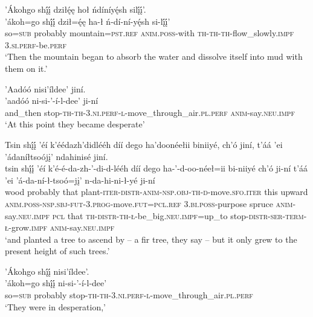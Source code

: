 \ea\label{ex:text4-2-17}
’Ákohgo shį́į́ dziłę́ę hoł ńdíníyę́sh silį́į́’.\\
\gll ’ákoh=go	shį́į́	dził=ę́ę	ha-ł	ń-dí-ní-yę́sh	si-lį́į́’\\
     so=\textsc{sub}	probably	mountain=\textsc{pst}.\textsc{ref}	\textsc{anim}.\textsc{poss}-with	\textsc{th}-\textsc{th}-\textsc{th}-flow\_slowly.\textsc{impf}	3.\textsc{si}.\textsc{perf}-be.\textsc{perf}\\
\glt `Then the mountain began to absorb the water and dissolve itself into mud with them on it.'
\z

\ea\label{ex:text4-2-18}
’Aadóó nisi’íldee’ jiní.\\
\gll ’aadóó	ni-si-’-í-l-dee’	ji-ní\\
     and\_then	stop-\textsc{th}-\textsc{th}-3.\textsc{ni}.\textsc{perf}-\textsc{l}-move\_through\_air.\textsc{pl}.\textsc{perf}	\textsc{anim}-say.\textsc{neu}.\textsc{impf}\\
\glt `At this point they became desperate'
\z

\ea\label{ex:text4-2-19}
Tsin shį́į́ ’éí k’éédazh’didlééh díí dego ha’doonéełii biniiyé, ch’ó jiní, t’áá ’ei ’ádaníłtsoójį’ ndahinisé jiní.\\
\gll tsin	shį́į́	’éí	k’é-é-da-zh-’-di-d-lééh	díí	dego	ha-’-d-oo-néeł=ii	bi-niiyé	ch’ó	ji-ní	t’áá	’ei	’á-da-ní-ł-tsoó=jį’	n-da-hi-ni-ł-yé	ji-ní\\
     wood	probably	that	plant-\textsc{iter}-\textsc{distr}-\textsc{anim}-\textsc{nsp}.\textsc{obj}-\textsc{th}-\textsc{d}-move.\textsc{sfo}.\textsc{iter}	this	upward	\textsc{anim}.\textsc{poss}-\textsc{nsp}.\textsc{sbj}-\textsc{fut}-3.\textsc{prog}-move.\textsc{fut}=\textsc{pcl}.\textsc{ref}	3.\textsc{bi}.\textsc{poss}-purpose	spruce	\textsc{anim}-say.\textsc{neu}.\textsc{impf}	\textsc{pcl}	that	\textsc{th}-\textsc{distr}-\textsc{th}-\textsc{ł}-be\_big.\textsc{neu}.\textsc{impf}=up\_to	stop-\textsc{distr}-\textsc{ser}-\textsc{term}-\textsc{ł}-grow.\textsc{impf}	\textsc{anim}-say.\textsc{neu}.\textsc{impf}\\
\glt `and planted a tree to ascend by -- a fir tree, they say -- but it only grew to the present height of such trees.'
\z

\ea\label{ex:text4-2-20}
’Ákohgo shį́į́ nisi’íldee’.\\
\gll ’ákoh=go	shį́į́	ni-si-’-í-l-dee’\\
     so=\textsc{sub}	probably	stop-\textsc{th}-\textsc{th}-3.\textsc{ni}.\textsc{perf}-\textsc{l}-move\_through\_air.\textsc{pl}.\textsc{perf}\\
\glt `They were in desperation,'
\z

